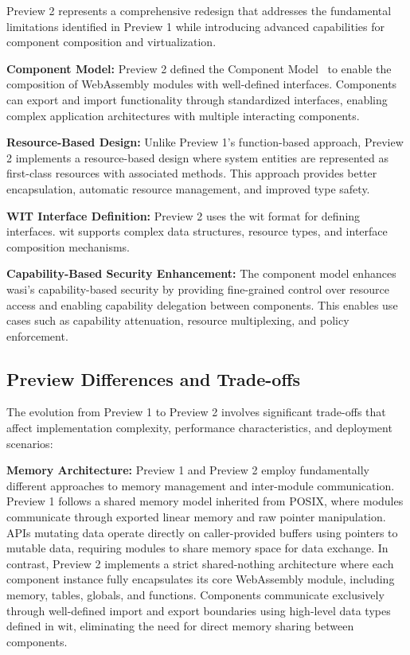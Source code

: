 Preview 2 represents a comprehensive redesign that addresses the fundamental limitations identified in Preview 1 while introducing advanced capabilities for component composition and virtualization.

\textbf{Component Model:} Preview 2 defined the Component Model~\cite{wasi_component_model} to enable the composition of WebAssembly modules with well-defined interfaces. Components can export and import functionality through standardized interfaces, enabling complex application architectures with multiple interacting components.

\textbf{Resource-Based Design:} Unlike Preview 1's function-based approach, Preview 2 implements a resource-based design where system entities are represented as first-class resources with associated methods. This approach provides better encapsulation, automatic resource management, and improved type safety.

\textbf{WIT Interface Definition:} Preview 2 uses the \acrshort{wit} format for defining interfaces. \acrshort{wit} supports complex data structures, resource types, and interface composition mechanisms.

\textbf{Capability-Based Security Enhancement:} The component model enhances \acrshort{wasi}'s capability-based security by providing fine-grained control over resource access and enabling capability delegation between components. This enables use cases such as capability attenuation, resource multiplexing, and policy enforcement.

\subsection{Preview Differences and Trade-offs}
\label{subsec:preview-differences}
The evolution from Preview 1 to Preview 2 involves significant trade-offs that affect implementation complexity, performance characteristics, and deployment scenarios:

\textbf{Memory Architecture:} Preview 1 and Preview 2 employ fundamentally different approaches to memory management and inter-module communication. Preview 1 follows a shared memory model inherited from POSIX, where modules communicate through exported linear memory and raw pointer manipulation. APIs mutating data operate directly on caller-provided buffers using pointers to mutable data, requiring modules to share memory space for data exchange. In contrast, Preview 2 implements a strict shared-nothing architecture where each component instance fully encapsulates its core WebAssembly module, including memory, tables, globals, and functions. Components communicate exclusively through well-defined import and export boundaries using high-level data types defined in \acrshort{wit}, eliminating the need for direct memory sharing between components.

